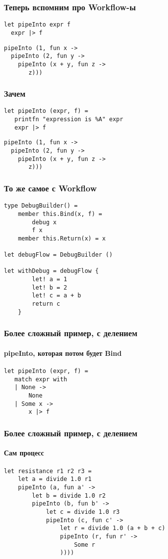 \documentclass[xetex,mathserif,serif]{beamer}
\begin{document}
    \begin{frame}[fragile]
        \frametitle{Теперь вспомним про Workflow-ы}
        \begin{verbatim}
let pipeInto expr f
  expr |> f
        \end{verbatim}
        \begin{verbatim}
pipeInto (1, fun x ->
  pipeInto (2, fun y -> 
    pipeInto (x + y, fun z -> 
       z)))
        \end{verbatim}
    \end{frame}

    \begin{frame}[fragile]
        \frametitle{Зачем}
        \begin{verbatim}
let pipeInto (expr, f) =
   printfn "expression is %A" expr 
   expr |> f 
        \end{verbatim}
        \begin{verbatim}
pipeInto (1, fun x ->
  pipeInto (2, fun y -> 
    pipeInto (x + y, fun z -> 
       z)))
        \end{verbatim}
    \end{frame}

    \begin{frame}[fragile]
        \frametitle{То же самое с Workflow}
        \begin{verbatim}
type DebugBuilder() =
    member this.Bind(x, f) = 
        debug x 
        f x
    member this.Return(x) = x

let debugFlow = DebugBuilder ()

let withDebug = debugFlow {
        let! a = 1
        let! b = 2
        let! c = a + b
        return c
    }
        \end{verbatim}
    \end{frame}

    \begin{frame}[fragile]
        \frametitle{Более сложный пример, с делением}
        \framesubtitle{pipeInto, которая потом будет Bind}
        \begin{verbatim}
let pipeInto (expr, f) =
   match expr with
   | None -> 
       None
   | Some x -> 
       x |> f
        \end{verbatim}
    \end{frame}

    \begin{frame}[fragile]
        \frametitle{Более сложный пример, с делением}
        \framesubtitle{Сам процесс}
        \begin{verbatim}
let resistance r1 r2 r3 = 
    let a = divide 1.0 r1
    pipeInto (a, fun a' ->
        let b = divide 1.0 r2
        pipeInto (b, fun b' ->
            let c = divide 1.0 r3
            pipeInto (c, fun c' ->
                let r = divide 1.0 (a + b + c)
                pipeInto (r, fun r' ->
                    Some r
                ))))
        \end{verbatim}
    \end{frame}
\end{document}
